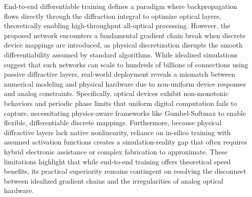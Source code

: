 \documentclass[11pt]{article}
\begin{document}
End-to-end differentiable training defines a paradigm where backpropagation flows directly through the diffraction integral to optimize optical layers, theoretically enabling high-throughput all-optical processing. However, the proposed network encounters a fundamental gradient chain break when discrete device mappings are introduced, as physical discretization disrupts the smooth differentiability assumed by standard algorithms. While idealized simulations suggest that such networks can scale to hundreds of billions of connections using passive diffractive layers, real-world deployment reveals a mismatch between numerical modeling and physical hardware due to non-uniform device responses and analog constraints. Specifically, optical devices exhibit non-monotonic behaviors and periodic phase limits that uniform digital computation fails to capture, necessitating physics-aware frameworks like Gumbel-Softmax to enable flexible, differentiable discrete mappings. \citep{doi_10_1145_3508352_3549378_13c53996} Furthermore, because physical diffractive layers lack native nonlinearity, reliance on in-silico training with assumed activation functions creates a simulation-reality gap that often requires hybrid electronic assistance or complex fabrication to approximate. These limitations highlight that while end-to-end training offers theoretical speed benefits, its practical superiority remains contingent on resolving the disconnect between idealized gradient chains and the irregularities of analog optical hardware. \citep{doi_10_1145_3508352_3549378_13c53996} \citep{doi_10_1126_science_aat8084_e055772d} \citep{doi_10_1109_dac56929_2023_10247715_f78d6713} \citep{doi_10_1126_sciadv_adu0904_786138ff}
\end{document}
